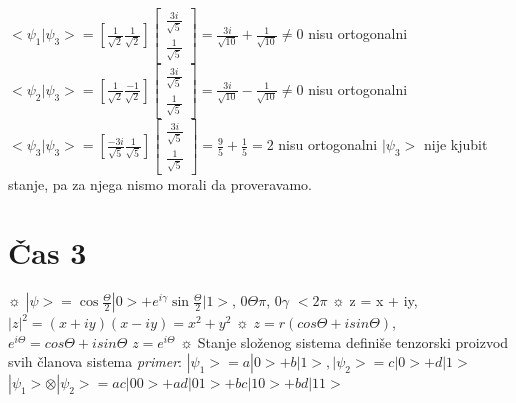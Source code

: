 \documentclass{article}
\begin{document}
$<\psi_1|\psi_3> = [\frac{1}{\sqrt{2}} \frac{1}{\sqrt{2}}]\begin{bmatrix}
    \frac{3i}{\sqrt{5}}\\
    \frac{1}{\sqrt{5}}
\end{bmatrix} = 
\frac{3i}{\sqrt{10}} + \frac{1}{\sqrt{10}} \neq 0 $ nisu ortogonalni
\vspace{0.3cm}\newline
$<\psi_2|\psi_3> = [\frac{1}{\sqrt{2}} \frac{-1}{\sqrt{2}}]\begin{bmatrix}
    \frac{3i}{\sqrt{5}}\\
    \frac{1}{\sqrt{5}}
\end{bmatrix} = 
\frac{3i}{\sqrt{10}} - \frac{1}{\sqrt{10}} \neq 0 $ nisu ortogonalni
\vspace{0.3cm}\newline
$<\psi_3|\psi_3> = [\frac{-3i}{\sqrt{5}} \frac{1}{\sqrt{5}}]\begin{bmatrix}
    \frac{3i}{\sqrt{5}}\\
    \frac{1}{\sqrt{5}}
\end{bmatrix} = 
\frac{9}{5} + \frac{1}{5} = 2 $ nisu ortogonalni
\vspace{0.3cm}\newline
$|\psi_3>$ nije kjubit stanje, pa za njega nismo morali da proveravamo. 
\newpage

\section{Čas 3}

\begin{tcolorbox}[width=\textwidth,colback={beaublue},outer arc=0mm,colupper=charcoal]    

$\sun$ $|\psi> = \cos{\frac{\Theta}{2}}|0> + e^{i\gamma}\sin{\frac{\Theta}{2}}|1>$, 0\leq$\Theta$\leq$\pi$, 0\leq$\gamma$ $<2\pi$
\vspace{0.1cm}\newline
$\sun$ z = x + iy, $|z|^2 = (x+iy)(x-iy) = x^2 + y^2$
\vspace{0.1cm}\newline
$\sun$ $z = r(cos\Theta + isin\Theta)$, $e^{i\Theta} = cos\Theta + isin\Theta$ \Rightarrow $z = e^{i\Theta}$
\vspace{0.1cm}\newline
$\sun$ Stanje složenog sistema definiše tenzorski proizvod svih članova sistema
\newline \textit{primer}: $|\psi_1> = a|0> + b|1>, |\psi_2> = c|0> + d|1>$
\newline \hspace*{0.8cm}$|\psi_1> \otimes |\psi_2> = ac|00> + ad|01> + bc|10> + bd|11>$

\end{tcolorbox}  
\end{document}
